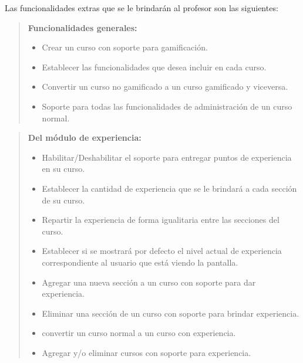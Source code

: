     \noindent
    Las funcionalidades extras que se le brindarán al profesor son las siguientes:

    \begin{quote}
    {\bf Funcionalidades generales:}
        \begin{itemize}
        \item Crear un curso con soporte para gamificación.
        \item Establecer las funcionalidades que desea incluir en cada curso.
        \item Convertir un curso no gamificado a un curso gamificado y viceversa.
        \item Soporte para todas las funcionalidades de administración de un curso
              normal.
        \end{itemize}
    \end{quote}

    \begin{quote}
    {\bf Del módulo de experiencia:}
        \begin{itemize}
        \item Habilitar/Deshabilitar el soporte para entregar puntos de experiencia
              en su curso.
        \item Establecer la cantidad de experiencia que se le brindará a cada
              sección de su curso.
        \item Repartir la experiencia de forma igualitaria entre las secciones del
              curso.
        \item Establecer si se mostrará por defecto el nivel actual de experiencia
              correspondiente al usuario que está viendo la pantalla.
        \item Agregar una nueva sección a un curso con soporte para dar experiencia.
        \item Eliminar una sección de un curso con soporte para brindar experiencia.
        \item convertir un curso normal a un curso con experiencia.
        \item Agregar y/o eliminar cursos con soporte para experiencia.
        \end{itemize}
    \end{quote}

